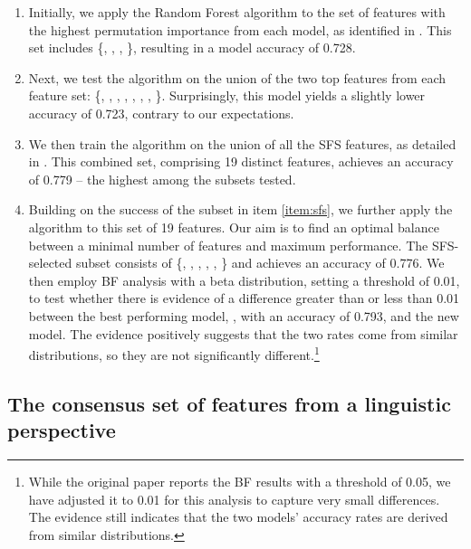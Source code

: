 \begin{enumerate}
	
	\item Initially, we apply the Random Forest algorithm to the set of features with the highest permutation importance from each model, as identified in . This set includes \{, , , \}, resulting in a model accuracy of 0.728.
    
    \item Next, we test the algorithm on the union of the two top features from each feature set: \{,
    , , , , , 
    ,
    \}. Surprisingly, this model yields a slightly lower accuracy of 0.723, contrary to our expectations.
      
    \item \label{item:sfs} We then train the algorithm on the union of all the SFS features, as detailed in . This combined set, comprising 19 distinct features, achieves an accuracy of 0.779 – the highest among the subsets tested.
    
    \item \label{item:sfsunion} Building on the success of the subset in item \ref{item:sfs}, we further apply the  algorithm to this set of 19 features. Our aim is to find an optimal balance between a minimal number of features and maximum performance. The SFS-selected subset consists of \{, , , , , \} and achieves an accuracy of 0.776.  We then employ BF analysis with a beta distribution, setting a threshold of 0.01, to test whether there is evidence of a difference greater than or less than 0.01 between the best performing model, , with an accuracy of 0.793, and the new model.
    The evidence positively suggests that the two rates come from similar distributions, so they are not significantly different.\footnote{While the original paper \citep{same-van-deemter-2020-linguistic} reports the BF results with a threshold of 0.05, we have adjusted it to 0.01 for this analysis to capture very small differences. The evidence still indicates that the two models' accuracy rates are derived from similar distributions.}
    
\end{enumerate}


\subsection{The consensus set of features from a linguistic perspective}\label{subsec:consensusling}

